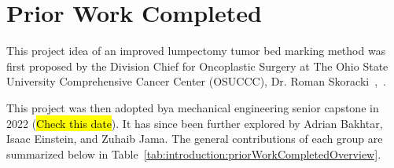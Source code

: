 \section{Prior Work Completed\label{introduction:priorWork}}

This project idea of an improved lumpectomy tumor bed marking method was first proposed by the Division Chief for Oncoplastic Surgery at The Ohio State University Comprehensive Cancer Center (OSUCCC), Dr. Roman Skoracki~\cite{RefWorks:RefID:372-krakovskytumor},~\cite{RefWorks:RefID:371-bakhtardesign}.

This project was then adopted bya mechanical engineering senior capstone in 2022 (\hl{Check this date}). It has since been further explored by Adrian Bakhtar, Isaac Einstein, and Zuhaib Jama. The general contributions of each group are summarized below in Table~\ref{tab:introduction:priorWorkCompletedOverview}.


